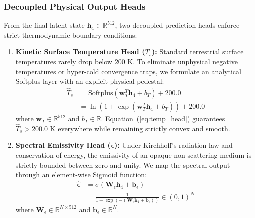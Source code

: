 \documentclass[journal]{IEEEtran}
\begin{document}
\subsubsection{Decoupled Physical Output Heads}
From the final latent state $\bm{h}_4 \in \mathbb{R}^{512}$, two decoupled prediction heads enforce strict thermodynamic boundary conditions:
\begin{enumerate}
    \item \textbf{Kinetic Surface Temperature Head ($T_s$):} Standard terrestrial surface temperatures rarely drop below $200\text{ K}$. To eliminate unphysical negative temperatures or hyper-cold convergence traps, we formulate an analytical Softplus layer with an explicit physical pedestal:
    \begin{equation}
    \begin{aligned}
    \hat{T}_s &= \text{Softplus}(\bm{w}_T^T \bm{h}_4 + b_T) + 200.0 \\
    &= \ln\left(1 + \exp(\bm{w}_T^T \bm{h}_4 + b_T)\right) + 200.0
    \end{aligned}
    \label{eq:temp_head}
    \end{equation}
    where $\bm{w}_T \in \mathbb{R}^{512}$ and $b_T \in \mathbb{R}$. Equation~(\ref{eq:temp_head}) guarantees $\hat{T}_s > 200.0\text{ K}$ everywhere while remaining strictly convex and smooth.
    
    \item \textbf{Spectral Emissivity Head ($\bm{\epsilon}$):} Under Kirchhoff's radiation law and conservation of energy, the emissivity of an opaque non-scattering medium is strictly bounded between zero and unity. We map the spectral output through an element-wise Sigmoid function:
    \begin{equation}
    \begin{aligned}
    \hat{\bm{\epsilon}} &= \sigma(\bm{W}_\epsilon \bm{h}_4 + \bm{b}_\epsilon) \\
    &= \frac{1}{1 + \exp(-(\bm{W}_\epsilon \bm{h}_4 + \bm{b}_\epsilon))} \in (0, 1)^N
    \end{aligned}
    \label{eq:eps_head}
    \end{equation}
    where $\bm{W}_\epsilon \in \mathbb{R}^{N \times 512}$ and $\bm{b}_\epsilon \in \mathbb{R}^N$.
\end{enumerate}
\end{document}
